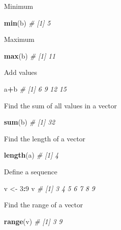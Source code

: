\documentclass[
]{book}
\newenvironment{Shaded}{\begin{snugshade}}{\end{snugshade}}
\newcommand{\CommentTok}[1]{\textcolor[rgb]{0.56,0.35,0.01}{\textit{#1}}}
\newcommand{\DecValTok}[1]{\textcolor[rgb]{0.00,0.00,0.81}{#1}}
\newcommand{\FunctionTok}[1]{\textcolor[rgb]{0.13,0.29,0.53}{\textbf{#1}}}
\newcommand{\NormalTok}[1]{#1}
\newcommand{\OtherTok}[1]{\textcolor[rgb]{0.56,0.35,0.01}{#1}}
\newcommand{\SpecialCharTok}[1]{\textcolor[rgb]{0.81,0.36,0.00}{\textbf{#1}}}
\begin{document}
Minimum

\begin{Shaded}
\begin{Highlighting}[]
\FunctionTok{min}\NormalTok{(b)}
\CommentTok{\# [1] 5}
\end{Highlighting}
\end{Shaded}

Maximum

\begin{Shaded}
\begin{Highlighting}[]
\FunctionTok{max}\NormalTok{(b)}
\CommentTok{\# [1] 11}
\end{Highlighting}
\end{Shaded}

Add values

\begin{Shaded}
\begin{Highlighting}[]
\NormalTok{a}\SpecialCharTok{+}\NormalTok{b}
\CommentTok{\# [1]  6  9 12 15}
\end{Highlighting}
\end{Shaded}

Find the sum of all values in a vector

\begin{Shaded}
\begin{Highlighting}[]
\FunctionTok{sum}\NormalTok{(b)}
\CommentTok{\# [1] 32}
\end{Highlighting}
\end{Shaded}

Find the length of a vector

\begin{Shaded}
\begin{Highlighting}[]
\FunctionTok{length}\NormalTok{(a)}
\CommentTok{\# [1] 4}
\end{Highlighting}
\end{Shaded}

Define a sequence

\begin{Shaded}
\begin{Highlighting}[]
\NormalTok{v }\OtherTok{\textless{}{-}} \DecValTok{3}\SpecialCharTok{:}\DecValTok{9}
\NormalTok{v}
\CommentTok{\# [1] 3 4 5 6 7 8 9}
\end{Highlighting}
\end{Shaded}

Find the range of a vector

\begin{Shaded}
\begin{Highlighting}[]
\FunctionTok{range}\NormalTok{(v)}
\CommentTok{\# [1] 3 9}
\end{Highlighting}
\end{Shaded}
\end{document}
